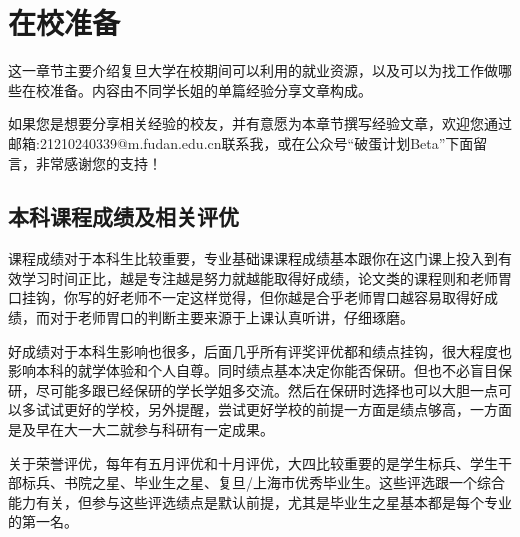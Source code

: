 \chapter{在校准备}

这一章节主要介绍复旦大学在校期间可以利用的就业资源，以及可以为找工作做哪些在校准备。内容由不同学长姐的单篇经验分享文章构成。

如果您是想要分享相关经验的校友，并有意愿为本章节撰写经验文章，欢迎您通过邮箱:21210240339@m.fudan.edu.cn联系我，或在公众号“破蛋计划Beta”下面留言，非常感谢您的支持！

\section{本科课程成绩及相关评优}

课程成绩对于本科生比较重要，专业基础课课程成绩基本跟你在这门课上投入到有效学习时间正比，越是专注越是努力就越能取得好成绩，论文类的课程则和老师胃口挂钩，你写的好老师不一定这样觉得，但你越是合乎老师胃口越容易取得好成绩，而对于老师胃口的判断主要来源于上课认真听讲，仔细琢磨。

好成绩对于本科生影响也很多，后面几乎所有评奖评优都和绩点挂钩，很大程度也影响本科的就学体验和个人自尊。同时绩点基本决定你能否保研。但也不必盲目保研，尽可能多跟已经保研的学长学姐多交流。然后在保研时选择也可以大胆一点可以多试试更好的学校，另外提醒，尝试更好学校的前提一方面是绩点够高，一方面是及早在大一大二就参与科研有一定成果。

关于荣誉评优，每年有五月评优和十月评优，大四比较重要的是学生标兵、学生干部标兵、书院之星、毕业生之星、复旦/上海市优秀毕业生。这些评选跟一个综合能力有关，但参与这些评选绩点是默认前提，尤其是毕业生之星基本都是每个专业的第一名。